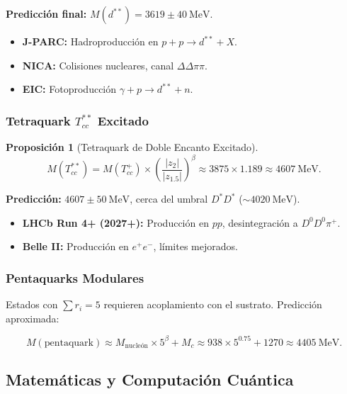 \documentclass[11pt, a4paper]{article}
\theoremstyle{plain}
\newtheorem{proposicion}[teorema]{Proposición}
\theoremstyle{definition}
\begin{document}
\textbf{Predicción final:} $M(d^{**}) = 3619 \pm 40\ \si{\mega\electronvolt}$.

\begin{itemize}
    \item \textbf{J-PARC:} Hadroproducción en $p + p \to d^{**} + X$.
    \item \textbf{NICA:} Colisiones nucleares, canal $\Delta\Delta\pi\pi$.
    \item \textbf{EIC:} Fotoproducción $\gamma + p \to d^{**} + n$.
\end{itemize}

\subsubsection{Tetraquark \texorpdfstring{$T_{cc}^{**}$}{Tcc**} Excitado}

\begin{proposicion}[Tetraquark de Doble Encanto Excitado]
\begin{equation}
M(T_{cc}^{**}) = M(T_{cc}^+) \times \left(\frac{|z_2|}{|z_{1.5}|}\right)^\beta \approx 3875 \times 1.189 \approx 4607\ \si{\mega\electronvolt}.
\end{equation}
\end{proposicion}

\textbf{Predicción:} $4607 \pm 50\ \si{\mega\electronvolt}$, cerca del umbral $D^*D^*$ ($\sim 4020\ \si{\mega\electronvolt}$).

\begin{itemize}
    \item \textbf{LHCb Run 4+ (2027+):} Producción en $pp$, desintegración a $D^0D^0\pi^+$.
    \item \textbf{Belle II:} Producción en $e^+e^-$, límites mejorados.
\end{itemize}

\subsubsection{Pentaquarks Modulares}

Estados con $\sum r_i = 5$ requieren acoplamiento con el sustrato. Predicción aproximada:

\begin{equation}
M(\text{pentaquark}) \approx M_{\text{nucleón}} \times 5^\beta + M_c \approx 938 \times 5^{0.75} + 1270 \approx 4405\ \si{\mega\electronvolt}.
\end{equation}

\subsection{Matemáticas y Computación Cuántica}
\end{document}
